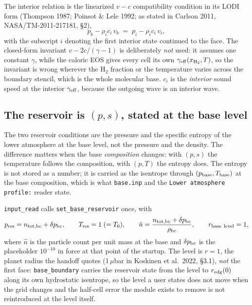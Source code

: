 \documentclass[english,a4paper]{my_memo}
\begin{document}
The interior relation is the linearized $v-c$ compatibility condition in its
LODI form (Thompson 1987; Poinsot \& Lele 1992; as stated in Carlson 2011,
NASA/TM-2011-217181, \S2),
\begin{equation}
p_b - \rho_i c_i\, v_b \;=\; p_i - \rho_i c_i\, v_i ,
\label{eq:cminus}
\end{equation}
with the subscript $i$ denoting the first interior state continued to the
face. The closed-form invariant $v - 2c/(\gamma-1)$ is deliberately
\emph{not} used: it assumes one constant $\gamma$, while the caloric EOS
gives every cell its own $\gamma_{\rm eff}(x_{\rm H_2},T)$, so the invariant
is wrong wherever the H$_2$ fraction or the temperature varies across the
boundary stencil, which is the whole molecular base. $c_i$ is the
\emph{interior} sound speed at the interior $\gamma_{\rm eff}$, because the
outgoing wave is an interior wave.

\subsection{The reservoir is $(p,s)$, stated at the base level}
\label{sec:reservoir}

The two reservoir conditions are the pressure and the specific entropy of
the lower atmosphere at the base level, not the pressure and the density.
The difference matters when the base \emph{composition} changes: with
$(p,s)$ the temperature follows the composition, with $(p,T)$ the entropy
does. The entropy is not stored as a number; it is carried as the isentrope
through $(p_{\rm base}, T_{\rm base})$ at the base composition, which is
what \texttt{base.inp} and the \texttt{Lower atmosphere profile:} reader
state.

\texttt{input\_read} calls \texttt{set\_base\_reservoir} once, with
\begin{equation}
p_{\rm res} = n_{\rm tot,bc} + \delta p_{\rm bc}, \qquad
T_{\rm res} = 1 \;(=T_0), \qquad
\hat n = \frac{n_{\rm tot,bc}+\delta p_{\rm bc}}{\rho_{\rm bc}}, \qquad
r_{\rm base\ level} = 1 ,
\end{equation}
where $\hat n$ is the particle count per unit mass at the base and
$\delta p_{\rm bc}$ is the placeholder $10^{-10}$ in force at that point of
the startup. The level is $r = 1$, the planet radius the handoff quotes
(1\,$\mu$bar in Koskinen et al.\ 2022, \S3.1), \emph{not} the first face:
\texttt{base\_boundary} carries the reservoir state from the level to
$r_{\rm edg}(0)$ along its own hydrostatic isentrope, so the level a user
states does not move when the grid changes and the half-cell error the
module exists to remove is not reintroduced at the level itself.
\end{document}
